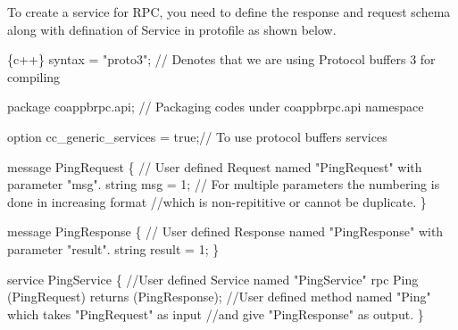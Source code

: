 To create a service for R\+PC, you need to define the response and request schema along with defination of Service in protofile as shown below. 
\begin{DoxyCode}
\{c++\}
syntax = "proto3"; // Denotes that we are using Protocol buffers 3 for compiling

package coappbrpc.api; // Packaging codes under coappbrpc.api namespace

option cc\_generic\_services = true;// To use protocol buffers services

message PingRequest \{  // User defined Request named "PingRequest" with parameter "msg". 
    string msg = 1; // For multiple parameters the numbering is done in increasing format 
    //which is non-repititive or cannot be duplicate.
\}

message PingResponse \{  // User defined Response named "PingResponse" with parameter "result". 
    string result = 1;
\}

service PingService \{ //User defined Service named "PingService" 
    rpc Ping (PingRequest) returns (PingResponse); //User defined method named "Ping" which takes
       "PingRequest" as input 
    //and give "PingResponse" as output.
\}
\end{DoxyCode}


